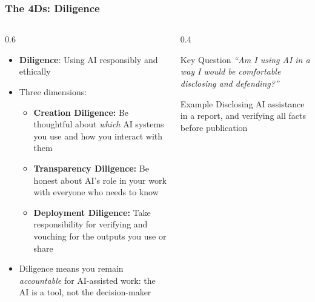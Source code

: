 \begin{frame}[fragile]\frametitle{The 4Ds: Diligence}
\begin{columns}
    \begin{column}[T]{0.6\linewidth}
      \begin{itemize}
        \item \textbf{Diligence}: Using AI responsibly and ethically
        \item Three dimensions:
          \begin{itemize}
            \item \textbf{Creation Diligence:} Be thoughtful about \emph{which} AI systems you use and how you interact with them
            \item \textbf{Transparency Diligence:} Be honest about AI's role in your work with everyone who needs to know
            \item \textbf{Deployment Diligence:} Take responsibility for verifying and vouching for the outputs you use or share
          \end{itemize}
        \item Diligence means you remain \emph{accountable} for AI-assisted work: the AI is a tool, not the decision-maker
      \end{itemize}
    \end{column}
    \begin{column}[T]{0.4\linewidth}
      \begin{alertblock}{Key Question}
        \emph{``Am I using AI in a way I would be comfortable disclosing and defending?''}
      \end{alertblock}
      \vspace{0.5em}
      \begin{exampleblock}{Example}
        Disclosing AI assistance in a report, and verifying all facts before publication
      \end{exampleblock}
    \end{column}
  \end{columns}
\end{frame}


